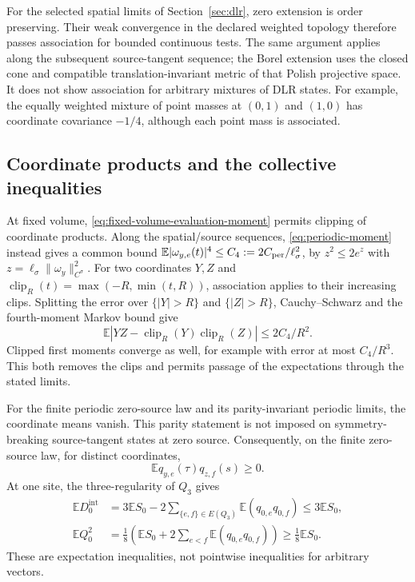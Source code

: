 \documentclass[11pt]{article}
\numberwithin{equation}{section}
\theoremstyle{definition}
\newcommand{\E}{\mathbb E}
\begin{document}
For the selected spatial limits of Section~\ref{sec:dlr}, zero extension is
order preserving. Their weak convergence in the declared weighted topology
therefore passes association for bounded continuous tests. The same argument
applies along the subsequent source-tangent sequence; the Borel extension
uses the closed cone and compatible translation-invariant metric of that
Polish projective space. It does not show association for arbitrary mixtures
of DLR states. For example, the equally weighted mixture of point masses at
$(0,1)$ and $(1,0)$ has coordinate covariance $-1/4$, although each point
mass is associated.

\subsection{Coordinate products and the collective inequalities}
\label{sec:fkg-products}

At fixed volume, \eqref{eq:fixed-volume-evaluation-moment} permits clipping
of coordinate products. Along the spatial/source sequences,
\eqref{eq:periodic-moment} instead gives a common bound
$\E|\omega_{y,e}(t)|^4\leq C_4:=2C_{\rm per}/\ell_\sigma^2$, by
$z^2\leq2e^z$ with $z=\ell_\sigma\|\omega_y\|_{C^\sigma}^2$.
For two coordinates $Y,Z$ and $\operatorname{clip}_R(t)=\max(-R,\min(t,R))$,
association applies to their increasing clips. Splitting the error over
$\{|Y|>R\}$ and $\{|Z|>R\}$, Cauchy--Schwarz and the fourth-moment
Markov bound give
\begin{equation}
 \E|YZ-\operatorname{clip}_R(Y)\operatorname{clip}_R(Z)|
 \leq 2C_4/R^2.
 \label{eq:fkg-product-clipping}
\end{equation}
Clipped first moments converge as well, for example with error at most
$C_4/R^3$. This both removes the clips and permits passage of the
expectations through the stated limits.

For the finite periodic zero-source law and its parity-invariant periodic
limits, the coordinate means vanish. This parity statement is not imposed
on symmetry-breaking source-tangent states at zero source. Consequently,
on the finite zero-source law, for distinct coordinates,
\begin{equation}
 \E q_{y,e}(\tau)q_{z,f}(s)\geq0. \label{eq:coordinate-covariance}
\end{equation}
At one site, the three-regularity of $Q_3$ gives
\begin{align}
 \E D_0^{\mathrm{int}}&=3\E S_0-2\sum_{\{e,f\}\in E(Q_3)}\E(q_{0,e}q_{0,f})
 \leq3\E S_0,\\
 \E Q_0^2&=\frac18\left(\E S_0+2\sum_{e<f}\E(q_{0,e}q_{0,f})\right)
 \geq\frac18\E S_0. \label{eq:fkg-local}
\end{align}
These are expectation inequalities, not pointwise inequalities for arbitrary
vectors.
\end{document}
